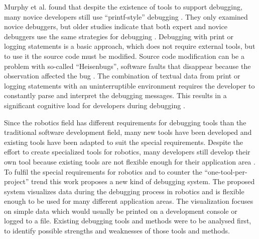 Murphy et al. found that despite the existence of tools to support debugging, many novice developers still use ``printf-style'' debugging \cite{Murphy2008}. They only examined novice debuggers, but older studies indicate that both expert and novice debuggers use the same strategies for debugging \cite{Gugerty1986}. Debugging with print or logging statements is a basic approach, which does not require external tools, but to use it the source code must be modified. Source code modification can be a problem with so-called ``Heisenbugs'', software faults that disappear because the observation affected the bug \cite{Grottke2005}. The combination of textual data from print or logging statements with an uninterruptible environment requires the developer to constantly parse and interpret the debugging messages. This results in a significant cognitive load for developers during debugging \cite{Jacobs2003}.


Since the robotics field has different requirements for debugging tools than the traditional software development field, many new tools have been developed and existing tools have been adapted to suit the special requirements. %
Despite the effort to create specialized tools for robotics, many developers still develop their own tool because existing tools are not flexible enough for their application area \cite{Collett2010}. %
To fulfil the special requirements for robotics and to counter the ``one-tool-per-project'' trend this work proposes a new kind of debugging system. The proposed system visualizes data during the debugging process in robotics and is flexible enough to be used for many different application areas. The visualization focuses on simple data which would usually be printed on a development console or logged to a file. Existing debugging tools and methods were to be analysed first, to identify possible strengths and weaknesses of those tools and methods.

